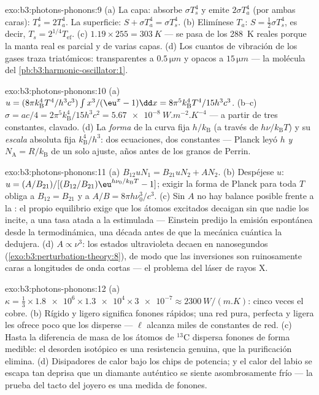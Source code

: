 \begin{solution}{exo:b3:photons-phonons:9}
(a) La capa: absorbe $\sigma T_s^4$ y emite $2\sigma T_a^4$ (por ambas
caras): $T_s^4 = 2T_a^4$. La superficie: $S + \sigma T_a^4 = \sigma
T_s^4$. (b) Elimínese $T_a$: $S = \tfrac12\sigma T_s^4$, es decir,
$T_s = 2^{1/4}T_{\text{ef}}$. (c) $1.19 \times 255 =
\qty{303}{K}$ --- se pasa de los \qty{288}{K} reales porque la
manta real es parcial y de varias capas. (d) Los cuantos de vibración
de los gases traza triatómicos: transparentes a $0.5\,\unit{\micro m}$ y
opacos a $15\,\unit{\micro m}$ --- la molécula del
\cref{pb:b3:harmonic-oscillator:1}.
\end{solution}

\begin{solution}{exo:b3:photons-phonons:10}
(a) $u = (8\pi k_{\text{B}}^4T^4/h^3c^3)\int x^3/(\eu^x - 1)\dd x
= 8\pi^5k_{\text{B}}^4T^4/15h^3c^3$. (b--c) $\sigma = ac/4 =
2\pi^5k_{\text{B}}^4/15h^3c^2 = \qty{5.67e-8}{W.m^{-2}.K^{-4}}$
--- a partir de tres constantes, clavado. (d) La \emph{forma} de la curva
fija $h/k_{\text{B}}$ (a través de $h\nu/k_{\text{B}}T$) y su
\emph{escala} absoluta fija $k_{\text{B}}^4/h^3$: dos ecuaciones,
dos constantes --- Planck leyó $h$ \emph{y} $N_{\text{A}} =
R/k_{\text{B}}$ de un solo ajuste, años antes de los granos de Perrin.
\end{solution}

\begin{solution}{exo:b3:photons-phonons:11}
(a) $B_{12}uN_1 = B_{21}uN_2 + AN_2$. (b) Despéjese $u$:
$u = (A/B_{21})/[(B_{12}/B_{21})\eu^{h\nu_0/k_{\text{B}}T} - 1]$;
exigir la forma de Planck para toda $T$ obliga a $B_{12} = B_{21}$ y a
$A/B = 8\pi h\nu_0^3/c^3$. (c) Sin $A$ no hay balance posible
frente a la : el propio equilibrio exige que los átomos
excitados decaigan sin que nadie los incite, a una tasa atada a la estimulada ---
Einstein predijo la emisión espontánea desde la termodinámica, una
década antes de que la mecánica cuántica la dedujera. (d) $A \propto
\nu^3$: los estados ultravioleta decaen en nanosegundos
(\cref{exo:b3:perturbation-theory:8}), de modo que las inversiones son
ruinosamente caras a longitudes de onda cortas --- el problema del láser
de rayos X.
\end{solution}

\begin{solution}{exo:b3:photons-phonons:12}
(a) $\kappa = \tfrac13 \times \num{1.8e6} \times \num{1.3e4}
\times \num{3e-7} \approx \qty{2300}{W/(m.K)}$: cinco veces el
cobre. (b) Rígido y ligero significa fonones rápidos; una red pura, perfecta
y ligera les ofrece poco que los disperse --- $\ell$ alcanza
miles de constantes de red. (c) Hasta la diferencia de masa de
los átomos de $^{13}$C dispersa fonones de forma medible: el desorden isotópico es
una resistencia genuina, que la purificación elimina. (d) Disipadores de calor
bajo los chips de potencia; y el calor del labio se escapa tan deprisa que un
diamante auténtico se siente asombrosamente frío --- la prueba del tacto del
joyero es una medida de fonones.
\end{solution}


